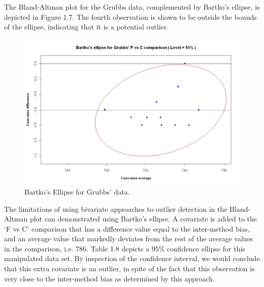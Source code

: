 \documentclass[12pt, a4paper]{report}
\theoremstyle{plain}
\theoremstyle{definition}
\theoremstyle{remark}
\begin{document}
	
	
	The Bland-Altman plot for the Grubbs data, complemented by Bartko's ellipse, is depicted in Figure 1.7.
	The fourth observation is shown to be outside the bounds of the ellipse, indicating that it is a potential outlier.
	
	
	\begin{figure}[h!]
		\includegraphics[width=130mm]{images/GrubbsBartko.jpeg}
		\caption{Bartko's Ellipse for Grubbs' data.}\label{GrubbsBartko}
	\end{figure}
	
	The limitations of using bivariate approaches to outlier detection
	in the Bland-Altman plot can demonstrated using Bartko's ellipse.
	A covariate is added to the `F vs C' comparison that has a
	difference value equal to the inter-method bias, and an average
	value that markedly deviates from the rest of the average values
	in the comparison, i.e. 786. Table 1.8 depicts a $95\%$ confidence
	ellipse for this manipulated data set. By inspection of the
	confidence interval, we would conclude that this extra
	covariate is an outlier, in spite of the fact that this
	observation is very close to the inter-method bias as determined by this approach.
	
\end{document}
